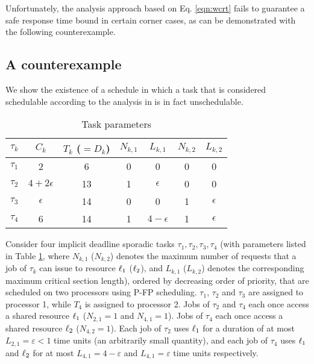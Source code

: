 Unfortunately, the analysis approach based on Eq. \ref{eqn:wcrt} fails to guarantee a safe response time bound in certain corner cases, as can be demonstrated with the following counterexample.

\subsection{A counterexample}
\label{sec:counterexample}

We show the existence of a schedule in which a task that is considered schedulable according to the analysis in \cite{lakshmanan-2009} is in fact unschedulable.



\begin{table}
\centering
    \begin{tabular}{|c|c|c|c|c|c|c|} 
 \hline
        $\tau_k$ & $C_k$ & $T_k$ ($= D_k$) & $N_{k,1}$ & $L_{k,1}$ & $N_{k,2}$ & $L_{k,2}$\\
        \hline
        $\tau_1$ & 2             & 6  & 0 & 0 & 0 & 0\\ 
        $\tau_2$ & $4+2\epsilon$ & 13 & 1 & $\epsilon$ & 0 & 0\\
        $\tau_3$ & $\epsilon$    & 14 & 0 & 0 & 1 & $\epsilon$\\
        $\tau_4$ & 6             & 14 & 1 & $4-\epsilon$ & 1 & $\epsilon$ \\ 
        \hline
    \end{tabular}
    \caption{Task parameters}
    \label{table:parameters}
\end{table}

Consider four implicit deadline sporadic tasks ${\tau_1, \tau_2, \tau_3, \tau_4}$ (with parameters listed in Table \ref{table:parameters}, where $N_{k,1}$ ($N_{k,2}$) denotes the maximum number of requests that a job of $\tau_k$ can issue to resource $\ell_1$ ($\ell_2$), and $L_{k,1}$ ($L_{k,2}$) denotes the corresponding maximum critical section length), ordered by decreasing order of priority, that are scheduled on two processors using P-FP scheduling. $\tau_1$, $\tau_2$ and $\tau_3$ are assigned to processor 1, while $T_4$ is assigned to processor 2. Jobs of $\tau_2$ and $\tau_4$   each once access a shared resource $\ell_1$  ($N_{2,1} = 1$ and $N_{4,1} = 1$). Jobs of $\tau_4$ each once access a shared resource $\ell_2$ ($N_{4,2} = 1$). Each job of $\tau_2$ uses $\ell_1$ for a duration of at most $L_{2,1} = \varepsilon < 1$ time units (an arbitrarily small quantity), and each job of $\tau_4$ uses $\ell_1$ and $\ell_2$ for at most $L_{4,1} = 4-\varepsilon$ and $L_{4,1} = \varepsilon$ time units respectively. 

